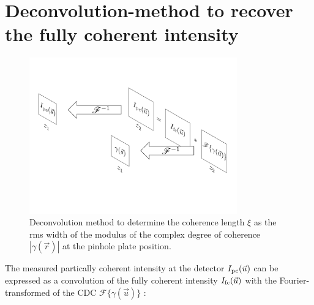 \documentclass{osa-article}
\begin{document}
\section{Deconvolution-method to recover the fully coherent intensity}


\begin{figure}[h!]
    \centering
    \includegraphics[trim={0cm 0cm 0cm 0cm}, width=0.8\textwidth]{gfx/deconvolution_sketch.pdf}
    \caption{Deconvolution method to determine the coherence length $\xi$ as the rms width of the modulus of the complex degree of coherence $|\gamma(\vec{r})|$ at the pinhole plate position.}
    \label{fig:deconvolution_method_flowchart}
\end{figure}

The measured partically coherent intensity at the detector $I_{\textup{pc}}(\vec{u})$ can be expressed as a convolution of the fully coherent intensity $I_{\textup{fc}}(\vec{u})$ with the Fourier-transformed of the CDC $\mathscr{F}\{\gamma(\vec{u})\}$ \cite[eq.33]{VartanyantsRobinson2001}:

\end{document}
